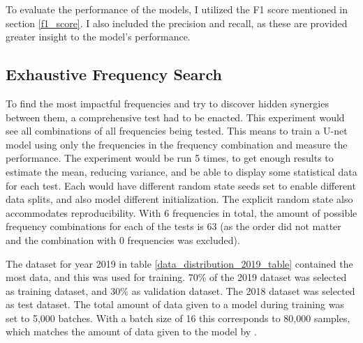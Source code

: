         To evaluate the performance of the models, I utilized the F1 score mentioned in section \ref{f1_score}. I also included the precision and recall, as these are provided greater insight to the model's performance.
        
    
    \subsection{Exhaustive Frequency Search}
    
        To find the most impactful frequencies and try to discover hidden synergies between them, a comprehensive test had to be enacted. This experiment would see all combinations of all frequencies being tested. This means to train a U-net model using only the frequencies in the frequency combination and measure the performance. The experiment would be run 5 times, to get enough results to estimate the mean,  reducing variance, and be able to display some statistical data for each test. Each would have different random state seeds set to enable different data splits, and also model different initialization. The explicit random state also accommodates reproducibility. With 6 frequencies in total, the amount of possible frequency combinations for each of the tests is 63 (as the order did not matter and the combination with 0 frequencies was excluded).
        
        The dataset for year 2019 in table \ref{data_distribution_2019_table} contained the most data, and this was used for training. 70\% of the 2019 dataset was selected as training dataset, and 30\% as validation dataset. The 2018 dataset was selected as test dataset. The total amount of data given to a model during training was set to 5,000 batches. With a batch size of 16 this corresponds to 80,000 samples, which matches the amount of data given to the model by \citeauthor{brautaset2020acoustic}\cite{brautaset2020acoustic}.
        
